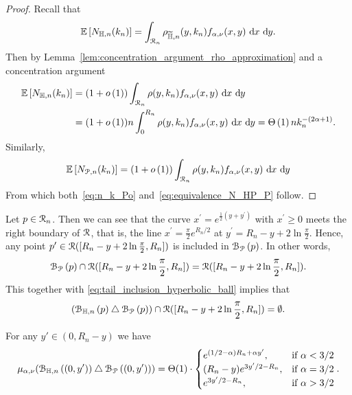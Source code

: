 \begin{proof}
Recall that
\[
	\mathbb{E}\left[N_{\mathbb{H},n}(k_n)\right] = \int_{{\mathcal R}_n} \rho_{\widetilde{\mathbb{H}},n}(y,k_n) f_{\alpha,\nu}(x,y) \operatorname{\, \mathrm{d}\hspace{-2pt}} x \operatorname{\, \mathrm{d}\hspace{-2pt}} y. 
\]
Then by Lemma~\ref{lem:concentration_argument_rho_approximation} and a concentration argument
\begin{align*}
	\mathbb{E}\left[N_{\mathbb{H},n}(k_n)\right] &= (1 + o\left(1\right))\int_{{\mathcal R}_n} \rho(y,k_n) f_{\alpha,\nu}(x,y) \operatorname{\, \mathrm{d}\hspace{-2pt}} x \operatorname{\, \mathrm{d}\hspace{-2pt}} y\\
	&= (1 + o\left(1\right)) n \int_{0}^{R_n} \rho(y,k_n) f_{\alpha,\nu}(x,y) \operatorname{\, \mathrm{d}\hspace{-2pt}} x \operatorname{\, \mathrm{d}\hspace{-2pt}} y = \Theta\left(1\right)n k_n^{-(2\alpha + 1)}.
\end{align*}
Similarly,
\[
	\mathbb{E}\left[N_{{\mathcal P},n}(k_n)\right] = (1 + o\left(1\right))\int_{{\mathcal R}_n} \rho(y,k_n) f_{\alpha,\nu}(x,y) \operatorname{\, \mathrm{d}\hspace{-2pt}} x \operatorname{\, \mathrm{d}\hspace{-2pt}} y
\]
From which both~\eqref{eq:n_k_Po} and~\eqref{eq:equivalence_N_HP_P} follow.
\end{proof}

Let $p \in {\mathcal R}_n$. Then we can see that the curve $x^\prime = e^{\frac{1}{2} (y + y^\prime)}$ with $x^\prime \geq 0$ meets the right boundary of ${\mathcal R}$, that is, the line $x^\prime = \frac{\pi}{2} e^{R_n/2}$ at $y^\prime = R_n - y + 2\ln \frac{\pi}{2}$. Hence, any point $p^{\prime} \in {\mathcal R} ([R_n - y + 2\ln \frac{\pi}{2}, R_n])$ is included in ${\mathcal B}_{{\mathcal P}}\left(p\right)$. In other words,
\begin{equation*} \label{eq:P_ball_inclusion_lower}
{\mathcal B}_{{\mathcal P}}\left(p\right) \cap {\mathcal R} ([R_n - y +2\ln \frac{\pi}{2},R_n]) = {\mathcal R} ([R_n - y + 2\ln \frac{\pi}{2},R_n]).
\end{equation*}
This together with \eqref{eq:tail_inclusion_hyperbolic_ball} implies that 
\begin{equation}\label{eq:symm_diff_upper_P} 
({\mathcal B}_{\mathbb{H},n}\left(p\right) \bigtriangleup {\mathcal B}_{{\mathcal P}}\left(p\right))  \cap {\mathcal R} ([R_n - y + 2 \ln \frac{\pi}{2},R_n]) = \emptyset. 
\end{equation}

\begin{lemma}\label{lem:sym_diff_measure_H_P}
For any $y' \in (0,R_n - y)$ we have
\[
	\mu_{\alpha,\nu} ({\mathcal B}_{\mathbb{H},n}\left((0,y')\right) \bigtriangleup {\mathcal B}_{{\mathcal P}}\left((0,y')\right) ) 
	= \Theta (1) \cdot \begin{cases} 
		e^{(1/2-\alpha)R_n + \alpha y'}, & \mbox{if } \alpha < 3/2 \\
		(R_n-y) e^{3y'/2 - R_n}, & \mbox{if }\alpha = 3/2\\
		e^{3y'/2 - R_n}, &  \mbox{if } \alpha > 3/2 
	\end{cases}.
\]
\end{lemma}

